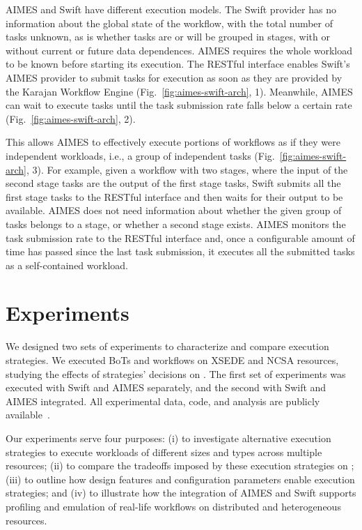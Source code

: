 \documentclass[10pt, conference, compsocconf]{IEEEtran}
\begin{document}
AIMES and Swift have different execution models. The Swift provider has no
information about the global state of the workflow, with the total number of
tasks unknown, as is whether tasks are or will be grouped in stages, with or
without current or future data dependences. AIMES requires the whole workload
to be known before starting its execution. The RESTful interface enables
Swift's AIMES provider to submit tasks for execution as soon as they are
provided by the Karajan Workflow Engine (Fig.~\ref{fig:aimes-swift-arch}, 1).
Meanwhile, AIMES can wait to execute tasks until the task submission rate
falls below a certain rate (Fig.~\ref{fig:aimes-swift-arch}, 2).

This allows AIMES to effectively execute portions of workflows as if they
were independent workloads, i.e., a group of independent tasks
(Fig.~\ref{fig:aimes-swift-arch}, 3). For example, given a workflow with two
stages, where the input of the second stage tasks are the output of the first
stage tasks, Swift submits all the first stage tasks to the RESTful interface
and then waits for their output to be available. AIMES does not need
information about whether the given group of tasks belongs to a stage, or
whether a second stage exists. AIMES monitors the task submission rate to the
RESTful interface and, once a configurable amount of time has passed since
the last task submission, it executes all the submitted tasks as a
self-contained workload.


\section{Experiments}\label{sec:exp}

We designed two sets of experiments to characterize and compare execution
strategies. We executed BoTs and workflows on XSEDE and NCSA resources,
studying the effects of strategies' decisions on . The first set of
experiments was executed with Swift and AIMES separately, and the second with
Swift and AIMES integrated. All experimental data, code, and analysis are
publicly available~\cite{aimes_swift_experiments_url}.

Our experiments serve four purposes: (i) to investigate alternative execution
strategies to execute workloads of different sizes and types across multiple
resources; (ii) to compare the tradeoffs imposed by these execution
strategies on ; (iii) to outline how design features and configuration
parameters enable execution strategies; and (iv) to illustrate how the
integration of AIMES and Swift supports profiling and emulation of real-life
workflows on distributed and heterogeneous resources.
\end{document}
